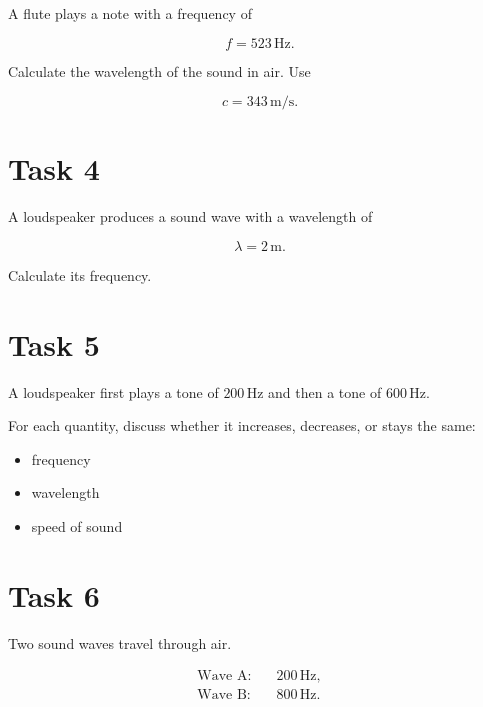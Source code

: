 \documentclass[a4paper,12pt]{article}
\begin{document}
A flute plays a note with a frequency of

\[
f = 523\,\mathrm{Hz}.
\]

Calculate the wavelength of the sound in air. Use

\[
c = 343\,\mathrm{m/s}.
\]



\section*{Task 4}

A loudspeaker produces a sound wave with a wavelength of

\[
\lambda = 2\,\mathrm{m}.
\]

Calculate its frequency.



\section*{Task 5}

A loudspeaker first plays a tone of $200\,\mathrm{Hz}$ and then a tone of
$600\,\mathrm{Hz}$.

For each quantity, discuss whether it increases, decreases, or stays
the same:

\begin{itemize}
    \item frequency
    \item wavelength
    \item speed of sound
\end{itemize}



\section*{Task 6}

Two sound waves travel through air.

\[
\begin{aligned}
\text{Wave A:}\quad &200\,\mathrm{Hz},\\
\text{Wave B:}\quad &800\,\mathrm{Hz}.
\end{aligned}
\]
\end{document}
